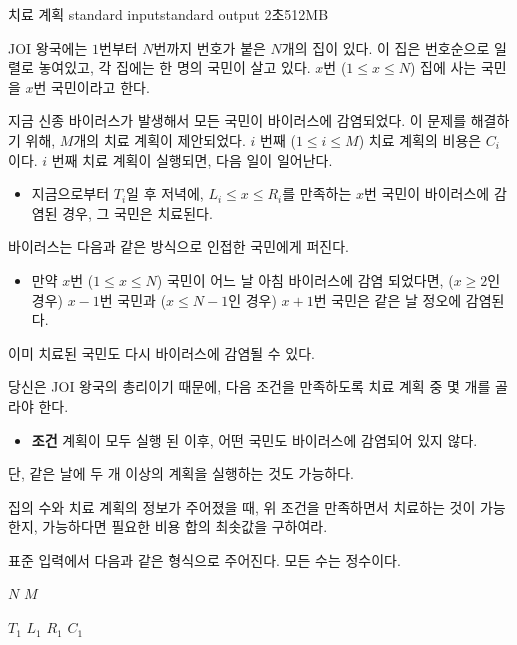 \begin{problem}{치료 계획}
	{standard input}{standard output}
	{2초}{512MB}{}
	
	JOI 왕국에는 $1$번부터 $N$번까지 번호가 붙은 $N$개의 집이 있다. 이 집은 번호순으로 일렬로 놓여있고, 각 집에는 한 명의 국민이 살고 있다. $x$번 ($1 \le x \le N$) 집에 사는 국민을 $x$번 국민이라고 한다.
	
	지금 신종 바이러스가 발생해서 모든 국민이 바이러스에 감염되었다. 이 문제를 해결하기 위해, $M$개의 치료 계획이 제안되었다. $i$ 번째 ($1 \le i \le M$) 치료 계획의 비용은 $C_i$이다. $i$ 번째 치료 계획이 실행되면, 다음 일이 일어난다.
	
	\begin{itemize}
		\item[] 지금으로부터 $T_i$일 후 저녁에, $L_i \le x \le R_i$를 만족하는 $x$번 국민이 바이러스에 감염된 경우, 그 국민은 치료된다.
	\end{itemize}

	바이러스는 다음과 같은 방식으로 인접한 국민에게 퍼진다.
	
	\begin{itemize}
		
		\item[] 만약 $x$번 ($1 \le x \le N$) 국민이 어느 날 아침 바이러스에 감염 되었다면, ($x \ge 2$인 경우) $x-1$번 국민과 ($x\le N-1$인 경우) $x+1$번 국민은 같은 날 정오에 감염된다.
	\end{itemize}

	이미 치료된 국민도 다시 바이러스에 감염될 수 있다.
	
	당신은 JOI 왕국의 총리이기 때문에, 다음 조건을 만족하도록 치료 계획 중 몇 개를 골라야 한다.
	
	\begin{itemize}
		\item[] \textbf{조건} 계획이 모두 실행 된 이후, 어떤 국민도 바이러스에 감염되어 있지 않다.
	\end{itemize}

	단, 같은 날에 두 개 이상의 계획을 실행하는 것도 가능하다.
	
	집의 수와 치료 계획의 정보가 주어졌을 때, 위 조건을 만족하면서 치료하는 것이 가능한지, 가능하다면 필요한 비용 합의 최솟값을 구하여라.
	
	
	
	\InputFile
	
	표준 입력에서 다음과 같은 형식으로 주어진다. 모든 수는 정수이다.
	
	$N$ $M$ 
	
	$T_1$ $L_1$ $R_1$ $C_1$
	

\end{problem}
